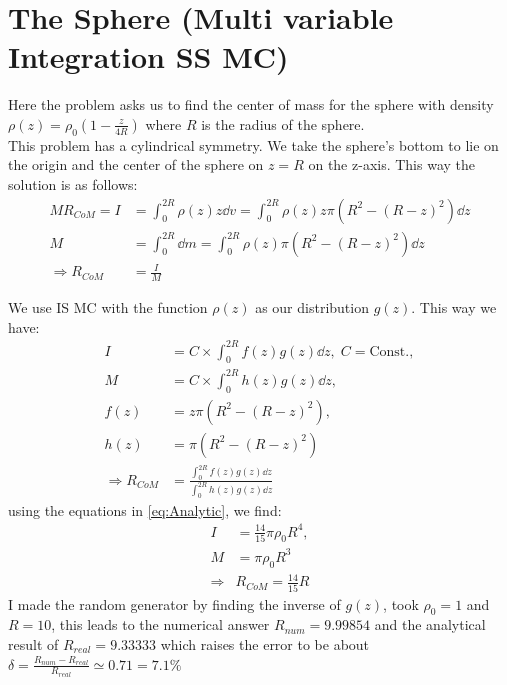 \documentclass[12pt]{article}
\begin{document}
	\section{The Sphere (Multi variable Integration SS MC)}
	Here the problem asks us to find the center of mass for the sphere with density
	$\rho(z) = \rho_0(1 - \frac{z}{4R})$ where $R$ is the radius of the sphere.\\
	This problem has a cylindrical symmetry. We take the sphere's bottom to lie on the origin
	and the center of the sphere on $z = R$ on the z-axis. This way the solution is as follows:
	\begin{equation}
		\begin{aligned} \label{eq:Analytic}
			MR_{CoM} = I &= \int_{0}^{2R} \rho(z) z \dd v = \int_{0}^{2R} \rho(z) z \pi \left(R^2 - (R - z)^2\right) 
			\dd z \\
			M &= \int_{0}^{2R} \dd m = \int_{0}^{2R} \rho(z) \pi \left(R^2 - (R - z)^2\right) \dd z\\
			\Rightarrow R_{CoM} &= \frac{I}{M}
		\end{aligned}
	\end{equation}
	
	We use IS MC with the function $\rho(z)$ as our distribution $g(z)$. This way we have:
	\begin{equation}
		\begin{aligned}
			I &= C \times \int_{0}^{2R} f(z) g(z) \dd z, \; C = \text{Const.},\\
			M &= C \times \int_{0}^{2R} h(z) g(z) \dd z,\\
			f(z) &= z \pi \left(R^2 - (R - z)^2\right),\\
			h(z) &= \pi \left(R^2 - (R - z)^2\right)\\
			\Rightarrow R_{CoM} &= \frac{\int_{0}^{2R} f(z) g(z) \dd z}{\int_{0}^{2R} h(z) g(z) \dd z}
		\end{aligned}
	\end{equation}
	using the equations in \ref{eq:Analytic}, we find:
	\begin{equation}
		\begin{aligned}
			I &= \frac{14}{15} \pi \rho_0 R^4,\\
			M &= \pi \rho_0 R^3\\
			\Rightarrow& R_{CoM} = \frac{14}{15} R
		\end{aligned}
	\end{equation}
	I made the random generator by finding the inverse of $g(z)$, took $\rho_0 = 1$ and
	$R = 10$, this leads to the numerical answer $R_{num} = 9.99854$ and the analytical result
	of $R_{real} =9.33333$ which raises the error to be about 
	$\delta = \frac{R_{num} - R_{real}}{R_{real}} \simeq 0.71 = 7.1 \%$
	
\end{document}

